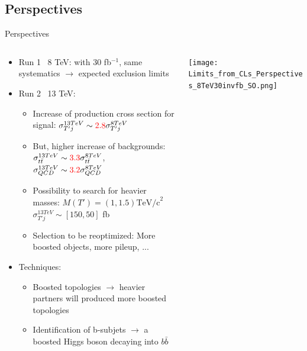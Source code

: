 \documentclass[usenames,dvipsnames]{beamer}
\newcommand{\bbbar}{$b\bar{b}$}
\begin{document}
\subsection{Perspectives}
\begin{frame}{Perspectives}

\begin{columns}
\begin{column}{.50\textwidth}
\begin{block}{}
\begin{itemize}\scriptsize
  \item Run 1 \MVAt~8 TeV: with 30 fb$^{-1}$, same systematics $\to$ expected exclusion limits 
  \item Run 2 \MVAt~13 TeV:
    \begin{itemize}\tiny
    \item Increase of production cross section for signal: $\sigma_{T'j}^{13 TeV}\sim \textcolor{red}{2.8}\sigma_{T'j}^{8 TeV}$
    \item But, higher increase of backgrounds: $\sigma^{13 TeV}_{t\bar{t}}\sim \textcolor{red}{3.3}\sigma^{8 TeV}_{t\bar{t}}$, $\sigma^{13 TeV}_{QCD}\sim \textcolor{red}{3.2}\sigma^{8 TeV}_{QCD}$
    \item Possibility to search for heavier masses: $M(T')= (1,1.5) \text{TeV/c}^{2}$  ${\sigma_{T'j}^{13 TeV}\sim [150,50] }$ fb
    \item Selection to be reoptimized: More boosted objects, more pileup, ...
    \end{itemize}
  \item Techniques:
    \begin{itemize}\tiny
    \item Boosted topologies $\to$ heavier partners will produced more boosted topologies
    \item Identification of b-subjets $\to$ a boosted Higgs boson decaying into \bbbar
    \end{itemize}

\end{itemize}
\end{block}
\end{column}

\begin{column}{.50\textwidth}
\begin{center}
    \texttt{[image: Limits\_from\_CLs\_Perspectives\_8TeV30invfb\_SO.png]}\\
  \end{center}
\end{column}

\end{columns}

\end{frame}
\end{document}
